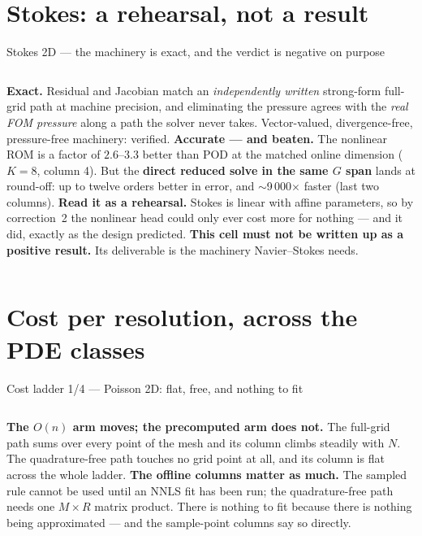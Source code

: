 \documentclass[10pt,aspectratio=169]{beamer}
\begin{document}
\section{Stokes: a rehearsal, not a result}
\begin{frame}{Stokes 2D --- the machinery is exact, and the verdict is negative on purpose}
  \centering\scriptsize
  

  \vspace{1.5mm}
  \begin{columns}[T]
    \footnotesize
    \textbf{Exact.} Residual and Jacobian match an \emph{independently written} strong-form
    full-grid path at machine precision, and eliminating the pressure agrees with the \emph{real
    FOM pressure} along a path the solver never takes. Vector-valued, divergence-free,
    pressure-free machinery: verified.
    \footnotesize
    \textbf{Accurate --- and beaten.} The nonlinear ROM is a factor of $2.6$--$3.3$ better than POD
    at the matched online dimension ($K=8$, column 4). But the \textbf{direct reduced solve in the
    same $G$ span} lands at round-off: up to twelve orders better in error, and $\sim$9\,000$\times$
    faster (last two columns).
    \footnotesize
    \textbf{Read it as a rehearsal.} Stokes is linear with affine parameters, so by correction~2 the
    nonlinear head could only ever cost more for nothing --- and it did, exactly as the design
    predicted. \textbf{This cell must not be written up as a positive result.} Its deliverable is
    the machinery Navier--Stokes needs.
  \end{columns}
\end{frame}

\section{Cost per resolution, across the PDE classes}

\begin{frame}{Cost ladder 1/4 --- Poisson 2D: flat, free, and nothing to fit}
  \centering\scriptsize
  

  \vspace{3mm}
  \begin{columns}[T]
    \footnotesize
    \textbf{The $O(n)$ arm moves; the precomputed arm does not.} The full-grid path sums over every
    point of the mesh and its column climbs steadily with $N$. The quadrature-free path touches no
    grid point at all, and its column is flat across the whole ladder.
    \footnotesize
    \textbf{The offline columns matter as much.} The sampled rule cannot be used until an NNLS fit
    has been run; the quadrature-free path needs one $M\times R$ matrix product. There is nothing to
    fit because there is nothing being approximated --- and the sample-point columns say so directly.
  \end{columns}
\end{frame}
\end{document}
